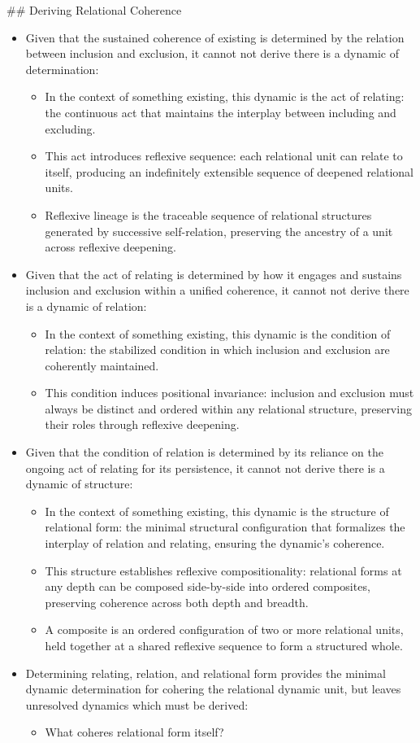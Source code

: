 \documentclass[11pt]{article}
\begin{document}
\#\# Deriving Relational Coherence
\begin{itemize}
\item Given that the sustained coherence of existing is determined by the relation between inclusion and exclusion, it cannot not derive there is a dynamic of determination:
\begin{itemize}
\item In the context of something existing, this dynamic is the act of relating: the continuous act that maintains the interplay between including and excluding.
\item This act introduces reflexive sequence: each relational unit can relate to itself, producing an indefinitely extensible sequence of deepened relational units.
\item Reflexive lineage is the traceable sequence of relational structures generated by successive self-relation, preserving the ancestry of a unit across reflexive deepening.
\end{itemize}
\item Given that the act of relating is determined by how it engages and sustains inclusion and exclusion within a unified coherence, it cannot not derive there is a dynamic of relation:
\begin{itemize}
\item In the context of something existing, this dynamic is the condition of relation: the stabilized condition in which inclusion and exclusion are coherently maintained.
\item This condition induces positional invariance: inclusion and exclusion must always be distinct and ordered within any relational structure, preserving their roles through reflexive deepening.
\end{itemize}
\item Given that the condition of relation is determined by its reliance on the ongoing act of relating for its persistence, it cannot not derive there is a dynamic of structure:
\begin{itemize}
\item In the context of something existing, this dynamic is the structure of relational form: the minimal structural configuration that formalizes the interplay of relation and relating, ensuring the dynamic's coherence.
\item This structure establishes reflexive compositionality: relational forms at any depth can be composed side-by-side into ordered composites, preserving coherence across both depth and breadth.
\item A composite is an ordered configuration of two or more relational units, held together at a shared reflexive sequence to form a structured whole.
\end{itemize}
\item Determining relating, relation, and relational form provides the minimal dynamic determination for cohering the relational dynamic unit, but leaves unresolved dynamics which must be derived:
\begin{itemize}
\item What coheres relational form itself?
\end{itemize}
\end{itemize}
\end{document}
